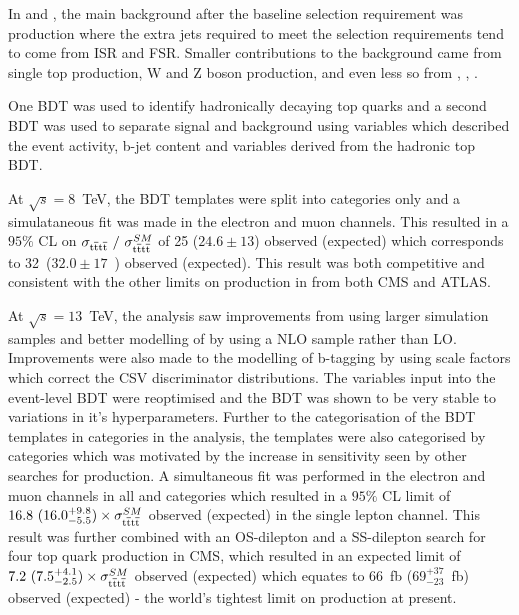 In \runone and \runtwo, the main background after the baseline selection requirement was \ttbar production where the extra jets required to meet the selection requirements tend to come from ISR and FSR. Smaller contributions to the background came from single top production, W and Z boson production, and even less so from \ttH, \ttW, \ttZ. 

One BDT was used to identify hadronically decaying top quarks and a second BDT was used to separate signal and background using variables which described the event activity, b-jet content and variables derived from the hadronic top BDT.

At $\sqrt{s}=8$~TeV, the BDT templates were split into \njets categories only and a simulataneous fit was made in the electron and muon channels. This resulted in a $95\%$ CL on $\sigma_{{\mathrm{t}\overline{\mathrm{t}}\mathrm{t}\overline{\mathrm{t}}}}~/~\sigma_{{\mathrm{t}\overline{\mathrm{t}}\mathrm{t}\overline{\mathrm{t}}}}^{SM} $ of 25 ($24.6\pm13$) observed (expected) which corresponds to 32~\fb ($32.0\pm17$~\fb) observed (expected). This result was both competitive and consistent with the other limits on \tttt production in \runone from both CMS and ATLAS.

At $\sqrt{s}=13$~TeV, the analysis saw improvements from using larger simulation samples and better modelling of \tttt by using a NLO sample rather than LO. Improvements were also made to the modelling of b-tagging by using scale factors which correct the CSV discriminator distributions.
The variables input into the event-level BDT were reoptimised and the BDT was shown to be very stable to variations in it's hyperparameters. Further to the categorisation of the BDT templates in \njets categories in the \runone analysis, the templates were also categorised by \nMtags categories which was motivated by the increase in sensitivity seen by other searches for \tttt production. A simultaneous fit was performed in the electron and muon channels in all \njets and \nMtags categories which resulted in a $95\%$ CL limit of $16.8~(16.0^{+9.8}_{-5.5})\times \sigma_{{\mathrm{t}\overline{\mathrm{t}}\mathrm{t}\overline{\mathrm{t}}}}^{SM} $ observed (expected) in the single lepton channel. This result was further combined with an OS-dilepton and a SS-dilepton search for four top quark production in CMS, which resulted in an expected limit of $7.2~(7.5^{+4.1}_{-2.5})\times \sigma_{{\mathrm{t}\overline{\mathrm{t}}\mathrm{t}\overline{\mathrm{t}}}}^{SM} $ observed (expected) which equates to 66~fb (69$^{+37}_{-23}$~fb) observed (expected) - the world's tightest limit on \tttt production at present.


